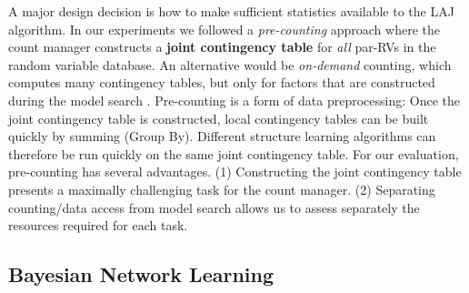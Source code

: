  A major design decision is how to make sufficient statistics available to the LAJ algorithm. In our experiments we followed a {\em pre-counting} approach where the count manager constructs a \textbf{joint contingency table} for {\em all} par-RVs in the random variable database. An alternative would be {\em on-demand} counting, which computes many contingency tables, but only for factors that are constructed during the model search \cite{Lv2012}.
Pre-counting is a form of data preprocessing: Once the joint contingency table is constructed, local contingency tables can be built quickly by summing (Group By). Different structure learning algorithms can therefore be run quickly on the same joint contingency table. 
%
For our evaluation, pre-counting has several advantages. (1) Constructing the joint contingency table presents a maximally challenging task for the count manager. (2) Separating counting/data access from model search allows us to assess separately the resources required for each task.


\subsection{Bayesian Network Learning} 



